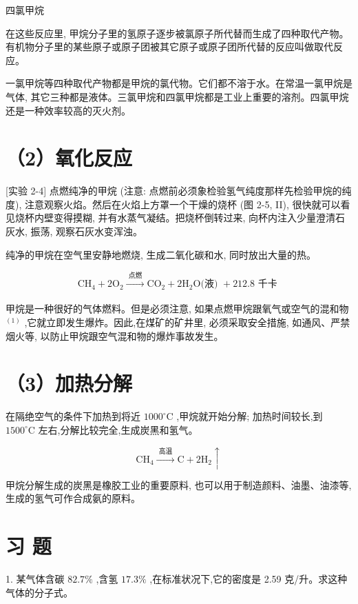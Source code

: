 \documentclass[10pt]{article}
\begin{document}
四氯甲烷

在这些反应里, 甲烷分子里的氢原子逐步被氯原子所代替而生成了四种取代产物。有机物分子里的某些原子或原子团被其它原子或原子团所代替的反应叫做取代反应。

一氯甲烷等四种取代产物都是甲烷的氯代物。它们都不溶于水。在常温一氯甲烷是气体, 其它三种都是液体。三氯甲烷和四氯甲烷都是工业上重要的溶剂。四氯甲烷还是一种效率较高的灭火剂。

\section*{（2）氧化反应}

[实验 2-4] 点燃纯净的甲烷 (注意: 点燃前必须象检验氢气纯度那样先检验甲烷的纯度), 注意观察火焰。然后在火焰上方罩一个干燥的烧杯 (图 2-5, II), 很快就可以看见烧杯内壁变得摸糊, 并有水蒸气凝结。把烧杯倒转过来, 向杯内注入少量澄清石灰水, 振荡, 观察石灰水变浑浊。

纯净的甲烷在空气里安静地燃烧, 生成二氧化碳和水, 同时放出大量的热。

\[
{\mathrm{{CH}}}_{4} + 2{\mathrm{O}}_{2}\xrightarrow[]{\text{ 点燃 }}{\mathrm{{CO}}}_{2} + 2{\mathrm{H}}_{2}\mathrm{O}\text{(液) } + {212.8}\text{ 千卡 }
\]

甲烷是一种很好的气体燃料。但是必须注意, 如果点燃甲烷跟氧气或空气的混和物 \({}^{\left( 1\right) }\) ,它就立即发生爆炸。因此,在煤矿的矿井里, 必须采取安全措施, 如通风、严禁烟火等, 以防止甲烷跟空气混和物的爆炸事故发生。

\section*{（3）加热分解}

在隔绝空气的条件下加热到将近 \({1000}^{ \circ }\mathrm{C}\) ,甲烷就开始分解; 加热时间较长,到 \({1500}^{ \circ }\mathrm{C}\) 左右,分解比较完全,生成炭黑和氢气。

\[
{\mathrm{{CH}}}_{4}\xrightarrow[]{\text{ 高温 }}\mathrm{C} + 2{\mathrm{H}}_{2} \uparrow
\]

甲烷分解生成的炭黑是橡胶工业的重要原料, 也可以用于制造颜料、油墨、油漆等, 生成的氢气可作合成氨的原料。

\section*{习 题}

1. 某气体含碳 \({82.7}\%\) ,含氢 \({17.3}\%\) ,在标准状况下,它的密度是 2.59 克/升。求这种气体的分子式。
\end{document}
